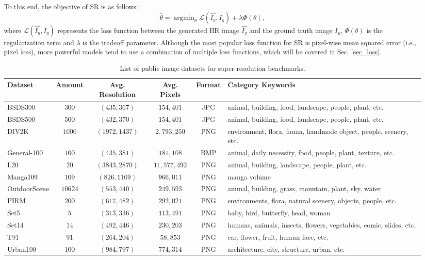 To this end, the objective of SR is as follows:
\begin{equation}
    \hat{\theta} = \mathop{\arg \min}_{\theta} \mathcal{L} (\hat{I_y}, I_y) + \lambda \Phi (\theta),
\end{equation}
where $\mathcal{L} (\hat{I_y}, I_y)$ represents the loss function between the generated HR image $\hat{I_y}$ and the ground truth image $I_y$, $\Phi (\theta)$ is the regularization term and $\lambda$ is the tradeoff parameter.
Although the most popular loss function for SR is pixel-wise mean squared error (i.e., pixel loss), more powerful models tend to use a combination of multiple loss functions, which will be covered in Sec. \ref{sec_loss}.

\label{sec_datasets}
\begin{table}[t]
    \renewcommand{\arraystretch}{1.3}
    \caption{List of public image datasets for super-resolution benchmarks.}
    \label{table_datasets}
    \centering
    \begin{tabular}{|l|c|c|c|c|l|}
        \hline
        Dataset & Amount & Avg. Resolution & Avg. Pixels & Format & Category Keywords \\
        \hline
        BSDS300          &   $300$ & $( 435,  367)$ &    $154,401$ & JPG & animal, building, food, landscape, people, plant, etc. \\
        BSDS500        &   $500$ & $( 432,  370)$ &    $154,401$ & JPG & animal, building, food, landscape, people, plant, etc. \\
        DIV2K           &  $1000$ & $(1972, 1437)$ &  $2,793,250$ & PNG & environment, flora, fauna, handmade object, people, scenery, etc. \\
        General-100    &   $100$ & $( 435,  381)$ &    $181,108$ & BMP & animal, daily necessity, food, people, plant, texture, etc. \\
        L20                &    $20$ & $(3843, 2870)$ & $11,577,492$ & PNG & animal, building, landscape, people, plant, etc. \\
        Manga109      &   $109$ & $( 826, 1169)$ &    $966,011$ & PNG & manga volume \\
        OutdoorScene     & $10624$ & $( 553,  440)$ &    $249,593$ & PNG & animal, building, grass, mountain, plant, sky, water \\
        PIRM                  &   $200$ & $( 617,  482)$ &    $292,021$ & PNG & environments, flora, natural scenery, objects, people, etc. \\
        Set5              &     $5$ & $( 313,  336)$ &    $113,491$ & PNG & baby, bird, butterfly, head, woman \\
        Set14               &    $14$ & $( 492,  446)$ &    $230,203$ & PNG & humans, animals, insects, flowers, vegetables, comic, slides, etc. \\
        T91                    &    $91$ & $( 264,  204)$ &     $58,853$ & PNG & car, flower, fruit, human face, etc. \\
        Urban100            &   $100$ & $( 984,  797)$ &    $774,314$ & PNG & architecture, city, structure, urban, etc. \\
        \hline
    \end{tabular}
\end{table}
